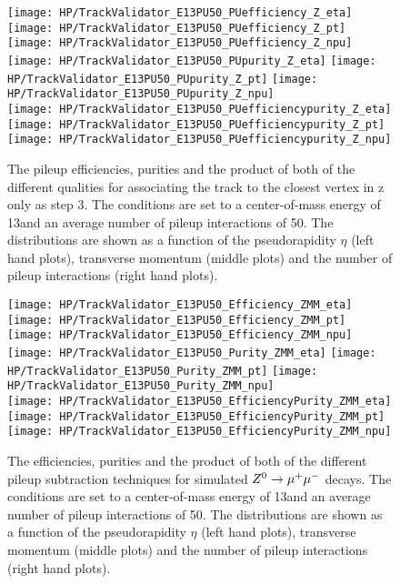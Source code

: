\begin{figure}[!h]
  \centering
  \texttt{[image: HP/TrackValidator\_E13PU50\_PUefficiency\_Z\_eta]}
  \texttt{[image: HP/TrackValidator\_E13PU50\_PUefficiency\_Z\_pt]}
  \texttt{[image: HP/TrackValidator\_E13PU50\_PUefficiency\_Z\_npu]}
   \\
  \texttt{[image: HP/TrackValidator\_E13PU50\_PUpurity\_Z\_eta]}
  \texttt{[image: HP/TrackValidator\_E13PU50\_PUpurity\_Z\_pt]}
  \texttt{[image: HP/TrackValidator\_E13PU50\_PUpurity\_Z\_npu]}
   \\
  \texttt{[image: HP/TrackValidator\_E13PU50\_PUefficiencypurity\_Z\_eta]}
  \texttt{[image: HP/TrackValidator\_E13PU50\_PUefficiencypurity\_Z\_pt]}
  \texttt{[image: HP/TrackValidator\_E13PU50\_PUefficiencypurity\_Z\_npu]}
  \caption[Pileup efficiencies, purities and their product of the different qualities of the association map with associating to the closest vertex in z only during step 3 with 13\TeV and PU=50]{The pileup efficiencies, purities and the product of both of the different qualities for associating the track to the closest vertex in z only as step 3. The conditions are set to a center-of-mass energy of 13\TeV and an average number of pileup interactions of 50. The distributions are shown as a function of the pseudorapidity $\eta$ (left hand plots), transverse momentum (middle plots) and the number of pileup interactions (right hand plots).}
\end{figure}
\clearpage

\begin{figure}[!h]
  \centering
  \texttt{[image: HP/TrackValidator\_E13PU50\_Efficiency\_ZMM\_eta]}
  \texttt{[image: HP/TrackValidator\_E13PU50\_Efficiency\_ZMM\_pt]}
  \texttt{[image: HP/TrackValidator\_E13PU50\_Efficiency\_ZMM\_npu]}
   \\
  \texttt{[image: HP/TrackValidator\_E13PU50\_Purity\_ZMM\_eta]}
  \texttt{[image: HP/TrackValidator\_E13PU50\_Purity\_ZMM\_pt]}
  \texttt{[image: HP/TrackValidator\_E13PU50\_Purity\_ZMM\_npu]}
   \\
  \texttt{[image: HP/TrackValidator\_E13PU50\_EfficiencyPurity\_ZMM\_eta]}
  \texttt{[image: HP/TrackValidator\_E13PU50\_EfficiencyPurity\_ZMM\_pt]}
  \texttt{[image: HP/TrackValidator\_E13PU50\_EfficiencyPurity\_ZMM\_npu]}
  \caption[Efficiencies, purities and their product of the different pileup subtraction techniques for $\Zz\rightarrow\MM$ decays with 13\TeV and PU=50]{The efficiencies, purities and the product of both of the different pileup subtraction techniques for simulated $\Zz\rightarrow\MM$ decays. The conditions are set to a center-of-mass energy of 13\TeV and an average number of pileup interactions of 50. The distributions are shown as a function of the pseudorapidity $\eta$ (left hand plots), transverse momentum (middle plots) and the number of pileup interactions (right hand plots).}
\end{figure}
\clearpage

